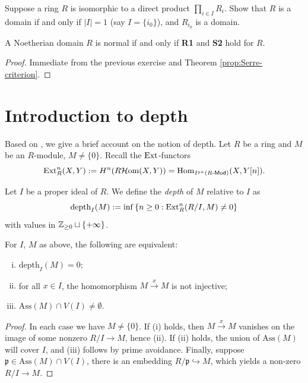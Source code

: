 \begin{exercise}
	Suppose a ring $R$ is isomorphic to a direct product $\prod_{i \in I} R_i$. Show that $R$ is a domain if and only if $|I|=1$ (say $I=\{i_0\}$), and $R_{i_0}$ is a domain.
\end{exercise}

\begin{corollary}
	A Noetherian domain $R$ is normal if and only if \textbf{R1} and \textbf{S2} hold for $R$.
\end{corollary}
\begin{proof}
	Immediate from the previous exercise and Theorem \ref{prop:Serre-criterion}.
\end{proof}

\section{Introduction to depth}
Based on \cite{Bour98}, we give a brief account on the notion of depth. Let $R$ be a ring and $M$ be an $R$-module, $M \neq \{0\}$. Recall the $\operatorname{Ext}$-functors
\[ \operatorname{Ext}^n_R(X,Y) := H^n(R\mathcal{H}\text{om}(X,Y)) = \text{Hom}_{D^+(R\text{-}\mathsf{Mod})}(X, Y[n]). \]

\begin{definition}
	Let $I$ be a proper ideal of $R$. We define the \emph{depth} of $M$ relative to $I$ as
	\[ \text{depth}_I(M) := \inf \left\{n \geq 0: \operatorname{Ext}^n_R(R/I, M) \neq 0 \right\} \]
	with values in $\mathbb{Z}_{\geq 0} \sqcup \{+\infty\}$.
\end{definition}

\begin{proposition}\label{prop:depth-zero}
	For $I$, $M$ as above, the following are equivalent:
	\begin{enumerate}[(i)]
		\item $\mathrm{depth}_I(M)=0$;
		\item for all $x \in I$, the homomorphism $M \xrightarrow{x} M$ is not injective;
		\item $\mathrm{Ass}(M) \cap V(I) \neq \emptyset$.
	\end{enumerate}
\end{proposition}
\begin{proof}
	In each case we have $M \neq \{0\}$. If (i) holds, then $M \xrightarrow{x} M$ vanishes on the image of some nonzero $R/I \to M$, hence (ii). If (ii) holds, the union of $\text{Ass}(M)$ will cover $I$, and (iii) follows by prime avoidance. Finally, suppose $\mathfrak{p} \in \text{Ass}(M) \cap V(I)$, there is an embedding $R/\mathfrak{p} \hookrightarrow M$, which yields a non-zero $R/I \to M$.
\end{proof}

